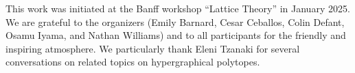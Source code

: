 \documentclass{amsart}
\theoremstyle{definition}
\begin{document}
This work was initiated at the Banff workshop ``Lattice Theory'' in January 2025.
We are grateful to the organizers (Emily Barnard, Cesar Ceballos, Colin Defant, Osamu Iyama, and Nathan Williams) and to all participants for the friendly and inspiring atmosphere.
We particularly thank Eleni Tzanaki for several conversations on related topics on hypergraphical polytopes.




\label{sec:biblio}

\end{document}
